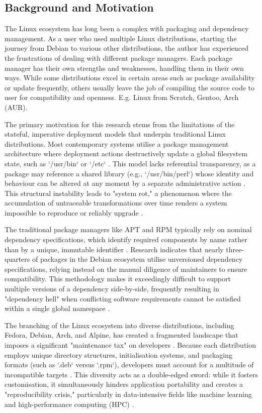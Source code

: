 \documentclass[journal,onecolumn]{IEEEtran}
\begin{document}
 
\newpage
\subsection{Background and Motivation}

The Linux ecosystem has long been a complex with packaging and dependency management. As a user who used multiple Linux distributions, starting the journey from Debian to various other distributions, the author has experienced the frustrations of dealing with different package managers. Each package manager has their own strengths and weaknesses, handling them in their own ways. While some distributions excel in certain areas such as package availability or update frequently, others usually leave the job of compiling the source code to user for compatibility and openness. E.g. Linux from Scratch, Gentoo, Arch (AUR). 

The primary motivation for this research stems from the limitations of the stateful, imperative deployment models that underpin traditional Linux distributions. Most contemporary systems utilise a package management architecture where deployment actions destructively update a global filesystem state, such as `/usr/bin` or `/etc` \cite{Varun2019}. This model lacks referential transparency, as a package may reference a shared library (e.g., `/usr/bin/perl`) whose identity and behaviour can be altered at any moment by a separate administrative action \cite{Varun2019}. This structural instability leads to "system rot," a phenomenon where the accumulation of untraceable transformations over time renders a system impossible to reproduce or reliably upgrade \cite{Varun2019}.

The traditional package managers like APT and RPM typically rely on nominal dependency specifications, which identify required components by name rather than by a unique, immutable identifier \cite{Varun2019}. Research indicates that nearly three-quarters of packages in the Debian ecosystem utilise unversioned dependency specifications, relying instead on the manual diligence of maintainers to ensure compatibility. This methodology makes it exceedingly difficult to support multiple versions of a dependency side-by-side, frequently resulting in "dependency hell" when conflicting software requirements cannot be satisfied within a single global namespace \cite{Varun2019}.

The branching of the Linux ecosystem into diverse distributions, including Fedora, Debian, Arch, and Alpine, has created a fragmented landscape that imposes a significant "maintenance tax" on developers \cite{Zam2025}. Because each distribution employs unique directory structures, initialisation systems, and packaging formats (such as `.deb` versus `.rpm`), developers must account for a multitude of incompatible targets \cite{Zam2025}. This diversity acts as a double-edged sword: while it fosters customisation, it simultaneously hinders application portability and creates a "reproducibility crisis," particularly in data-intensive fields like machine learning and high-performance computing (HPC) \cite{Zam2025}.
\end{document}

